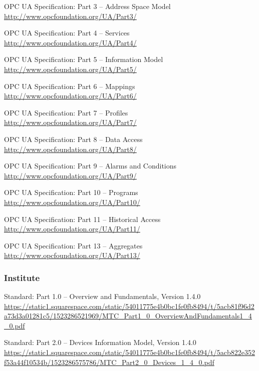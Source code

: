 \documentclass{mtconnect}	%
\begin{document}
\hang [UA Part 3]	OPC UA Specification: Part 3 -- Address Space Model \\
\url{http://www.opcfoundation.org/UA/Part3/}

\hang [UA Part 4]	OPC UA Specification: Part 4 -- Services \\
\url{http://www.opcfoundation.org/UA/Part4/}

\hang [UA Part 5]	OPC UA Specification: Part 5 -- Information Model \\
\url{http://www.opcfoundation.org/UA/Part5/}

\hang [UA Part 6]	OPC UA Specification: Part 6 -- Mappings \\
\url{http://www.opcfoundation.org/UA/Part6/}

\hang [UA Part 7]	OPC UA Specification: Part 7 -- Profiles \\
\url{http://www.opcfoundation.org/UA/Part7/}

\hang [UA Part 8]	OPC UA Specification: Part 8 -- Data Access \\
\url{http://www.opcfoundation.org/UA/Part8/}

\hang [UA Part 9]	OPC UA Specification: Part 9 -- Alarms and Conditions \\
\url{http://www.opcfoundation.org/UA/Part9/}

\hang [UA Part 10]	OPC UA Specification: Part 10 -- Programs \\
\url{http://www.opcfoundation.org/UA/Part10/}

\hang [UA Part 11]	OPC UA Specification: Part 11 -- Historical Access \\
\url{http://www.opcfoundation.org/UA/Part11/}

\hang [UA Part 13]	OPC UA Specification: Part 13 -- Aggregates \\
\url{http://www.opcfoundation.org/UA/Part13/}

\subsubsection{\mtconnect Institute}

\hang [MT Part 1.0]	\mtconnect Standard: Part 1.0 -- Overview and Fundamentals, Version 1.4.0 \\
\url{https://static1.squarespace.com/static/54011775e4b0bc1fe0fb8494/t/5acb81f96d2a73d3a01281c5/1523286521969/MTC_Part1_0_OverviewAndFundamentals1_4_0.pdf}

\hang [MT Part 2.0]	\mtconnect Standard: Part 2.0 -- Devices Information Model, Version 1.4.0 \\
\url{https://static1.squarespace.com/static/54011775e4b0bc1fe0fb8494/t/5acb822e352f53a44f10534b/1523286575786/MTC_Part2_0_Devices_1_4_0.pdf}
\end{document}
